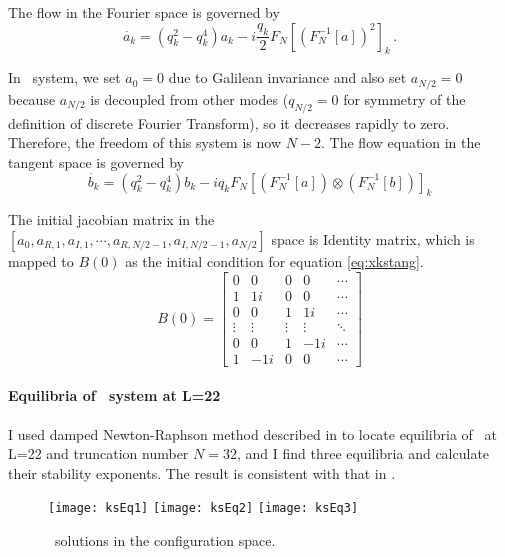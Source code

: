 The flow in the Fourier space is governed by
\begin{equation}
 \dot{a_k}=(q_{k}^2-q_k^4)a_k-i\frac{q_k}{2}F_{N}[(F_N^{-1}[a])^2]_k
 \,.
\end{equation}

In \KS\ system, we set $a_{0}=0$ due to Galilean invariance  and also set  $a_{N/2}=0$ because
$a_{N/2}$ is decoupled from other modes ($q_{N/2} = 0$ for symmetry of the definition of
discrete Fourier Transform), so it decreases rapidly to zero. Therefore, the freedom
of this system is now $N-2$. The flow equation in the tangent space is governed by
\begin{equation}
 \dot{b_k}=(q_{k}^2-q_k^4)b_k-iq_{k} F_{N}[(F_N^{-1}[a])\otimes (F_N^{-1}[b])]_k
 \label{eq:xkstang}
\end{equation}

The initial jacobian matrix in the  \\
$[a_{0}, a_{R,1}, a_{I,1}, \cdots , a_{R,N/2-1}, a_{I,N/2-1}, a_{N/2} ]$ space is  Identity matrix,
which is mapped to $B(0)$ as the initial condition
for equation \ref{eq:xkstang}.
\[B(0)=
\begin{bmatrix}
	0 & 0 & 0 & 0 & \cdots  \\
	1 & 1i & 0 & 0 & \cdots  \\
	0 & 0 & 1 & 1i & \cdots  \\
	\vdots & \vdots  & \vdots &\vdots &\ddots{} \\
	0 & 0 & 1 & -1i & \cdots  \\
	1 & -1i & 0 & 0 & \cdots
\end{bmatrix}
\]

\paragraph{Equilibria of \KS\ system at L=22}

I used damped Newton-Raphson method described in  to locate equilibria of
\KSe\ at L=22 and truncation number $N=32$, and I find three equilibria and
calculate their stability exponents. The result is
consistent with that in .

 \begin{figure}[h]
 \centering
 \texttt{[image: ksEq1]}
 \texttt{[image: ksEq2]}
 \texttt{[image: ksEq3]}
 \caption{\Eqva\ solutions in the configuration space.}
 \label{fig:xequi1}
\end{figure}

